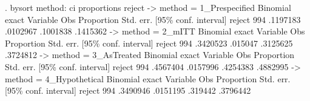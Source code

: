 . bysort method: ci proportions reject
{\smallskip}
-> method = 1_Prespecified
{\smallskip}
                                                            Binomial exact   
    Variable {\VBAR}        Obs  Proportion    Std. err.       [95\% conf. interval]
      reject {\VBAR}        994    .1197183    .0102967        .1001838    .1415362
{\smallskip}
-> method = 2_mITT
{\smallskip}
                                                            Binomial exact   
    Variable {\VBAR}        Obs  Proportion    Std. err.       [95\% conf. interval]
      reject {\VBAR}        994    .3420523     .015047        .3125625    .3724812
{\smallskip}
-> method = 3_AsTreated
{\smallskip}
                                                            Binomial exact   
    Variable {\VBAR}        Obs  Proportion    Std. err.       [95\% conf. interval]
      reject {\VBAR}        994    .4567404    .0157996        .4254383    .4882995
{\smallskip}
-> method = 4_Hypothetical
{\smallskip}
                                                            Binomial exact   
    Variable {\VBAR}        Obs  Proportion    Std. err.       [95\% conf. interval]
      reject {\VBAR}        994    .3490946    .0151195         .319442    .3796442
